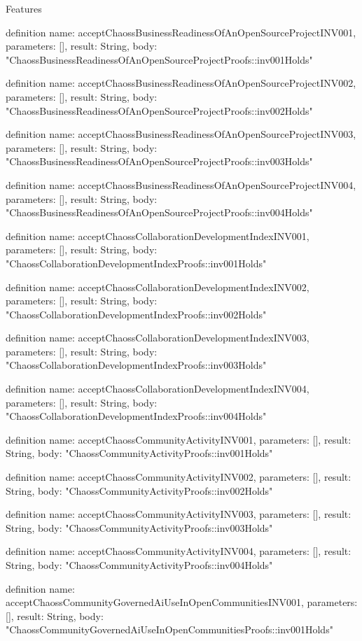 \begin{lexlean}{Features}
\begin{semanticmodule}
definition{
  name: acceptChaossBusinessReadinessOfAnOpenSourceProjectINV001,
  parameters: [],
  result: String,
  body: "ChaossBusinessReadinessOfAnOpenSourceProjectProofs::inv001Holds"
}

definition{
  name: acceptChaossBusinessReadinessOfAnOpenSourceProjectINV002,
  parameters: [],
  result: String,
  body: "ChaossBusinessReadinessOfAnOpenSourceProjectProofs::inv002Holds"
}

definition{
  name: acceptChaossBusinessReadinessOfAnOpenSourceProjectINV003,
  parameters: [],
  result: String,
  body: "ChaossBusinessReadinessOfAnOpenSourceProjectProofs::inv003Holds"
}

definition{
  name: acceptChaossBusinessReadinessOfAnOpenSourceProjectINV004,
  parameters: [],
  result: String,
  body: "ChaossBusinessReadinessOfAnOpenSourceProjectProofs::inv004Holds"
}

definition{
  name: acceptChaossCollaborationDevelopmentIndexINV001,
  parameters: [],
  result: String,
  body: "ChaossCollaborationDevelopmentIndexProofs::inv001Holds"
}

definition{
  name: acceptChaossCollaborationDevelopmentIndexINV002,
  parameters: [],
  result: String,
  body: "ChaossCollaborationDevelopmentIndexProofs::inv002Holds"
}

definition{
  name: acceptChaossCollaborationDevelopmentIndexINV003,
  parameters: [],
  result: String,
  body: "ChaossCollaborationDevelopmentIndexProofs::inv003Holds"
}

definition{
  name: acceptChaossCollaborationDevelopmentIndexINV004,
  parameters: [],
  result: String,
  body: "ChaossCollaborationDevelopmentIndexProofs::inv004Holds"
}

definition{
  name: acceptChaossCommunityActivityINV001,
  parameters: [],
  result: String,
  body: "ChaossCommunityActivityProofs::inv001Holds"
}

definition{
  name: acceptChaossCommunityActivityINV002,
  parameters: [],
  result: String,
  body: "ChaossCommunityActivityProofs::inv002Holds"
}

definition{
  name: acceptChaossCommunityActivityINV003,
  parameters: [],
  result: String,
  body: "ChaossCommunityActivityProofs::inv003Holds"
}

definition{
  name: acceptChaossCommunityActivityINV004,
  parameters: [],
  result: String,
  body: "ChaossCommunityActivityProofs::inv004Holds"
}

definition{
  name: acceptChaossCommunityGovernedAiUseInOpenCommunitiesINV001,
  parameters: [],
  result: String,
  body: "ChaossCommunityGovernedAiUseInOpenCommunitiesProofs::inv001Holds"
}


\end{semanticmodule}
\end{lexlean}
